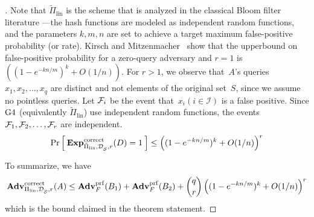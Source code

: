 \begin{proof}[]
Note that $\tilde{\Pi}_{\mathrm{lin}}$ is the scheme that is analyzed in the classical Bloom filter literature ---the hash functions are modeled as independent random functions, and the parameters $k,m,n$  are set to achieve a target maximum false-positive probability (or rate).  Kirsch and Mitzenmacher~\cite{KM} show that the upperbound on false-positive probability for a zero-query adversary and $r=1$ is $\left( (1-e^{-kn/m})^k + O(1/n) \right)$.  For $r>1$, we observe that~$A$'s queries $x_1,x_2,\ldots,x_q$ are distinct and not elements of the original set~$S$, since we assume no pointless queries. Let ${\cal F}_i$ be the event that~$x_i(i \in \mathcal{I})$ is a false positive.  Since $\text{G4}$ (equivalently $\tilde{\Pi}_{\mathrm{lin}}$) use independent random functions, the events ${\cal F}_1,{\cal F}_2,\ldots,{\cal F}_r$ are independent. 
\[
\Pr\left[\: \mathrm{\mathbf{Exp}}^{\mathrm{correct}}_{\tilde{\Pi}_{\mathrm{lin}},\mathcal{D}_{{\cal S}}^{},r}(D) = 1 \:\right]\leq \left( (1-e^{-kn/m})^k + O(1/n) \right)^r 
\]

To summarize, we have 
\[
\mathrm{\mathbf{Adv}}^{\mathrm{correct}}_{\Pi_{\mathrm{lin}},\mathcal{D}_{{\cal S}}^{},r}(A)  \leq  \mathbf{Adv}^{\mathrm{prf}}_{F}(B_1) +\mathbf{Adv}^{\mathrm{prf}}_{F}(B_2) +\dbinom{q}{r}\left( (1-e^{-kn/m})^k + O(1/n) \right)^r
\]
which is the bound claimed in the theorem statement. %


\end{proof}
